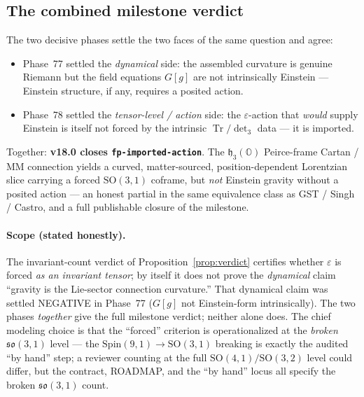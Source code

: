 \documentclass[11pt]{article}
\newcommand{\OO}{\mathbb{O}}
\newcommand{\Tr}{\operatorname{Tr}}
\newcommand{\so}{\mathfrak{so}}
\newcommand{\hh}{\mathfrak{h}}
\theoremstyle{definition}\newtheorem{remark}{Remark}
\theoremstyle{definition}\newtheorem{definition}{Definition}
\theoremstyle{plain}\newtheorem{proposition}{Proposition}
\theoremstyle{plain}\newtheorem{lemma}{Lemma}
\begin{document}
\subsection{The combined milestone verdict}
The two decisive phases settle the two faces of the same question and agree:
\begin{itemize}
\item Phase~77 settled the \emph{dynamical} side: the assembled curvature is genuine
Riemann but the field equations $G[g]$ are not intrinsically Einstein --- Einstein
structure, if any, requires a posited action.
\item Phase~78 settled the \emph{tensor-level / action} side: the $\varepsilon$-action
that \emph{would} supply Einstein is itself not forced by the intrinsic $\Tr/\det_3$
data --- it is imported.
\end{itemize}
Together: \textbf{v18.0 closes \texttt{fp-imported-action}}. The $\hh_3(\OO)$
Peirce-frame Cartan / MM connection yields a curved, matter-sourced, position-dependent
Lorentzian slice carrying a forced $\mathrm{SO}(3,1)$ coframe, but \emph{not} Einstein
gravity without a posited action --- an honest partial in the same equivalence class as
GST / Singh / Castro, and a full publishable closure of the milestone.

\paragraph{Scope (stated honestly).} The invariant-count verdict of
Proposition~\ref{prop:verdict} certifies whether $\varepsilon$ is forced \emph{as an
invariant tensor}; by itself it does not prove the \emph{dynamical} claim ``gravity is
the Lie-sector connection curvature.'' That dynamical claim was settled NEGATIVE in
Phase~77 ($G[g]$ not Einstein-form intrinsically). The two phases \emph{together} give
the full milestone verdict; neither alone does. The chief modeling choice is that the
``forced'' criterion is operationalized at the \emph{broken} $\so(3,1)$ level --- the
$\mathrm{Spin}(9,1)\to\mathrm{SO}(3,1)$ breaking is exactly the audited ``by hand''
step; a reviewer counting at the full $\mathrm{SO}(4,1)/\mathrm{SO}(3,2)$ level could
differ, but the contract, ROADMAP, and the ``by hand'' locus all specify the broken
$\so(3,1)$ count.
\end{document}
